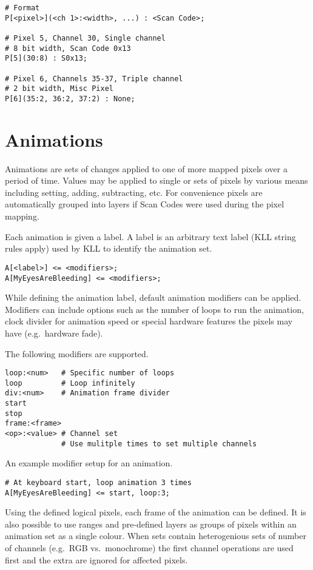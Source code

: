\documentclass{kiibohd-template}
\begin{document}
\begin{lstlisting}
# Format
P[<pixel>](<ch 1>:<width>, ...) : <Scan Code>;

# Pixel 5, Channel 30, Single channel
# 8 bit width, Scan Code 0x13
P[5](30:8) : S0x13;

# Pixel 6, Channels 35-37, Triple channel
# 2 bit width, Misc Pixel
P[6](35:2, 36:2, 37:2) : None;
\end{lstlisting}


\section{Animations}
\label{sec:animations}

Animations are sets of changes applied to one of more mapped pixels over a period of time.
Values may be applied to single or sets of pixels by various means including setting, adding, subtracting, etc.
For convenience pixels are automatically grouped into layers if Scan Codes were used during the pixel mapping.

Each animation is given a label.
A label is an arbitrary text label (KLL string rules apply) used by KLL to identify the animation set.

\begin{lstlisting}
A[<label>] <= <modifiers>;
A[MyEyesAreBleeding] <= <modifiers>;
\end{lstlisting}

While defining the animation label, default animation modifiers can be applied.
Modifiers can include options such as the number of loops to run the animation, clock divider for animation speed or special hardware features the pixels may have (e.g.\ hardware fade).

The following modifiers are supported.

\begin{lstlisting}
loop:<num>   # Specific number of loops
loop         # Loop infinitely
div:<num>    # Animation frame divider
start
stop
frame:<frame>
<op>:<value> # Channel set
             # Use mulitple times to set multiple channels
\end{lstlisting}

An example modifier setup for an animation.

\begin{lstlisting}
# At keyboard start, loop animation 3 times
A[MyEyesAreBleeding] <= start, loop:3;
\end{lstlisting}

Using the defined logical pixels, each frame of the animation can be defined.
It is also possible to use ranges and pre-defined layers as groups of pixels within an animation set as a single colour.
When sets contain heterogenious sets of number of channels (e.g.\ RGB vs.\ monochrome) the first channel operations are used first and the extra are ignored for affected pixels.
\end{document}
